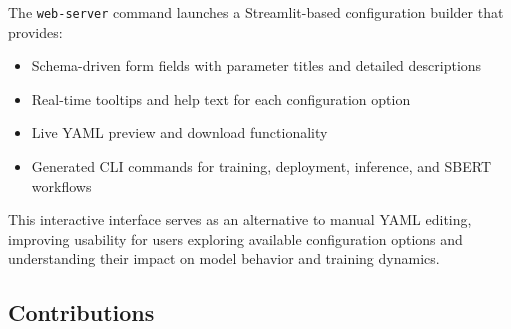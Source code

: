 \documentclass[11pt,a4paper]{article}
\begin{document}
The \texttt{web-server} command launches a Streamlit-based configuration builder that provides:
\begin{itemize}[leftmargin=*]
    \item Schema-driven form fields with parameter titles and detailed descriptions
    \item Real-time tooltips and help text for each configuration option
    \item Live YAML preview and download functionality
    \item Generated CLI commands for training, deployment, inference, and SBERT workflows
\end{itemize}

This interactive interface serves as an alternative to manual YAML editing, improving usability for users exploring available configuration options and understanding their impact on model behavior and training dynamics.

\subsection{Contributions}
\end{document}

